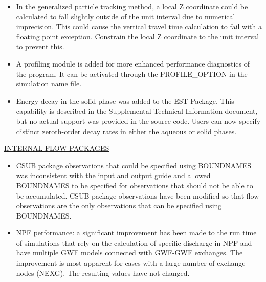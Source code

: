 \begin{itemize}
	\item In the generalized particle tracking method, a local Z coordinate could be calculated to fall slightly outside of the unit interval due to numerical imprecision. This could cause the vertical travel time calculation to fail with a floating point exception. Constrain the local Z coordinate to the unit interval to prevent this.
	\item A profiling module is added for more enhanced performance diagnostics of the program. It can be activated through the PROFILE\_OPTION in the simulation name file.
	\item Energy decay in the solid phase was added to the EST Package.  This capability is described in the Supplemental Technical Information document, but no actual support was provided in the source code.  Users can now specify distinct zeroth-order decay rates in either the aqueous or solid phases.
\end{itemize}

\underline{INTERNAL FLOW PACKAGES}
\begin{itemize}
	\item CSUB package observations that could be specified using BOUNDNAMES was inconsistent with the input and output guide and allowed BOUNDNAMES to be specified for observations that should not be able to be accumulated. CSUB package observations have been modified so that flow observations are the only observations that can be specified using BOUNDNAMES.
	\item NPF performance: a significant improvement has been made to the run time of simulations that rely on the calculation of specific discharge in NPF and have multiple GWF models connected with GWF-GWF exchanges. The improvement is most apparent for cases with a large number of exchange nodes (NEXG). The resulting values have not changed.
\end{itemize}



